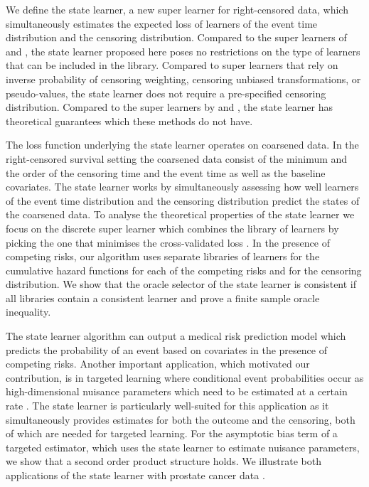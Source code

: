 \documentclass[a4paper,danish]{article}
\theoremstyle{plain} %
\numberwithin{theorem}{section}
\theoremstyle{definition} %
\theoremstyle{remark}
\newcommand{\1}{\mathds{1}}
\begin{document}
We define the state learner, a new super learner for
right-censored data, which simultaneously estimates the
expected loss of learners of the event time distribution and
the censoring distribution. Compared to the super learners of
\cite{polley2011-sl-cens} and \cite{golmakani2020super}, the
state learner proposed here poses no restrictions on the type
of learners that can be included in the library. Compared to
super learners that rely on inverse probability of censoring
weighting, censoring unbiased transformations, or
pseudo-values, the state learner does not require a
pre-specified censoring distribution. Compared to the super
learners by \cite{han2021inverse} and
\cite{westling2021inference}, the state learner has
theoretical guarantees which these methods do not have.

The loss function underlying the state learner operates on
coarsened data. In the right-censored survival setting the
coarsened data consist of the minimum and the order of the
censoring time and the event time as well as the baseline
covariates. The state learner works by simultaneously
assessing how well learners of the event time distribution and
the censoring distribution predict the states of the coarsened
data. To analyse the theoretical properties of the state
learner we focus on the discrete super learner which combines
the library of learners by picking the one that minimises the
cross-validated loss \citep{van2007super}. In the presence of
competing risks, our algorithm uses separate libraries of
learners for the cumulative hazard functions for each of the
competing risks and for the censoring distribution. We show
that the oracle selector of the state learner is consistent if
all libraries contain a consistent learner and prove a finite
sample oracle inequality.

The state learner algorithm can output a medical risk
prediction model \citep{gerds2021medical} which predicts the
probability of an event based on covariates in the presence of
competing risks. Another important application, which
motivated our contribution, is in targeted learning where
conditional event probabilities occur as high-dimensional
nuisance parameters which need to be estimated at a certain
rate \citep{van2011targeted, rytgaard2021estimation,
  rytgaard2022targeted}. The state learner is particularly
well-suited for this application as it simultaneously provides
estimates for both the outcome and the censoring, both of
which are needed for targeted learning. For the asymptotic
bias term of a targeted estimator, which uses the state
learner to estimate nuisance parameters, we show that a second
order product structure holds. We illustrate both applications
of the state learner with prostate cancer data
\citep{kattan2000pretreatment}.
\end{document}
